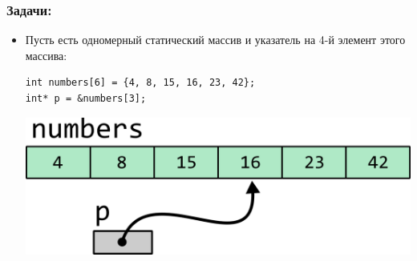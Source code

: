 \documentclass{article}
\begin{document}
\subsubsection*{Задачи:}
\begin{itemize}
\item Пусть есть одномерный статический массив и указатель на 4-й элемент этого массива:
\begin{lstlisting}
int numbers[6] = {4, 8, 15, 16, 23, 42};
int* p = &numbers[3];
\end{lstlisting}

\begin{center}
\includegraphics[scale=0.7]{../images/pointer_tasks/pointer_task_arithmetics.png}
\end{center}


\end{itemize}
\end{document}

